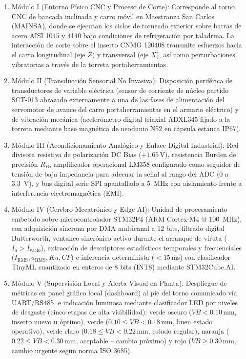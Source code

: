 \begin{enumerate}[leftmargin=0.8cm]
    \item Módulo I (Entorno Físico CNC y Proceso de Corte): Corresponde al torno CNC de bancada inclinada y carro móvil en Maestranza San Carlos (MAINSA), donde se ejecutan los ciclos de torneado exterior sobre barras de acero AISI 1045 y 4140 bajo condiciones de refrigeración por taladrina. La interacción de corte sobre el inserto CNMG 120408 transmite esfuerzos hacia el carro longitudinal (eje $Z$) y transversal (eje $X$), así como perturbaciones vibratorias a través de la torreta portaherramientas.
    \item Módulo II (Transducción Sensorial No Invasiva): Disposición periférica de transductores de variable eléctrica (sensor de corriente de núcleo partido SCT-013 abrazado externamente a una de las fases de alimentación del servomotor de avance del carro portaherramientas en el armario eléctrico) y de vibración mecánica (acelerómetro digital triaxial ADXL345 fijado a la torreta mediante base magnética de neodimio N52 en cápsula estanca IP67).
    \item Módulo III (Acondicionamiento Analógico y Enlace Digital Industrial): Red divisora resistiva de polarización DC Bias ($+1.65\,\text{V}$), resistencia Burden de precisión $R_B$, amplificador operacional LM358 configurado como seguidor de tensión de baja impedancia para adecuar la señal al rango del ADC (0 a 3.3~V), y bus digital serie SPI apantallado a 5~MHz con aislamiento frente a interferencia electromagnética (EMI).
    \item Módulo IV (Cerebro Mecatrónico y Edge AI): Unidad de procesamiento embebido sobre microcontrolador STM32F4 (ARM Cortex-M4 @ 100~MHz), con adquisición síncrona por DMA multicanal a 12 bits, filtrado digital Butterworth, ventaneo sincrónico activo durante el arranque de viruta ($I_a > I_{\text{vacío}}$), extracción de descriptores estadísticos temporales y frecuenciales ($I_{\text{RMS}}, a_{\text{RMS}}, Ku, CF$) e inferencia determinista ($<15\,\text{ms}$) con clasificador TinyML cuantizado en enteros de 8 bits (INT8) mediante STM32Cube.AI.
    \item Módulo V (Supervisión Local y Alerta Visual en Planta): Despliegue de métricas en panel gráfico local (dashboard) al pie del torno comunicado vía UART/RS485, e indicación luminosa mediante clasificador LED por niveles de desgaste (cinco etapas de alta visibilidad): verde oscuro ($VB < 0.10\,\text{mm}$, inserto nuevo u óptimo), verde ($0.10 \le VB < 0.18\,\text{mm}$, buen estado operativo), verde claro ($0.18 \le VB < 0.22\,\text{mm}$, estado regular), naranja ($0.22 \le VB < 0.30\,\text{mm}$, aceptable -- cambio próximo) y rojo ($VB \ge 0.30\,\text{mm}$, cambio urgente según norma ISO 3685).
\end{enumerate}

